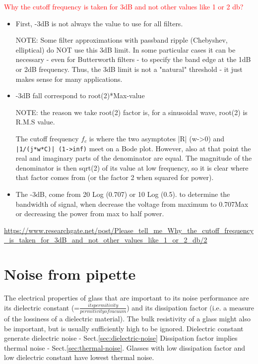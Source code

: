 \textcolor{red}{Why the cutoff frequency is taken for 3dB and not other values
like 1 or 2 db?}
\begin{itemize}
  \item First, -3dB is not always the value to use for all filters.

NOTE: Some filter approximations with passband ripple (Chebyshev, elliptical) do
NOT use this 3dB limit. In some particular cases it can be necessary - even for
Butterworth filters - to specify the band edge at the 1dB or 2dB frequency.
Thus, the 3dB limit is not a "natural" threshold - it just makes sense for many
applications.

  \item -3dB fall correspond to root(2)*Max-value

NOTE: the reason we take root(2) factor is, for a sinusoidal wave, root(2) is
R.M.S value.

The cutoff frequency $f_c$ is where the two asymptotes |R| (w->0) and
\verb!|1/(j*w*C)| (1->inf)! meet on a Bode plot.
However, also at that point the real and imaginary parts of the denominator are
equal. The magnitude of the denominator is then sqrt(2) of its value at low
frequency, so it is clear where that factor comes from (or the factor 2 when
squared for power).

  \item The -3dB, come from 20 Log (0.707) or 10 Log (0.5). to determine the
  bandwidth of signal, when decrease the voltage from maximum to 0.707Max or
  decreasing the power from max to half power.

\end{itemize}
\url{https://www.researchgate.net/post/Please_tell_me_Why_the_cutoff_frequency_is_taken_for_3dB_and_not_other_values_like_1_or_2_db/2}

\section{Noise from pipette}


The electrical properties of glass that are important to its noise performance
are its dielectric constant (=$\frac{its permitivity}{permitivity of vacuum}$)
and its dissipation factor (i.e. a measure of the lossiness of a dielectric
material). The bulk resistivity of a glass might also be important, but is
usually sufficiently high to be ignored.
Dielectric constant generate dielectric noise - Sect.\ref{sec:dielectric-noise}
Dissipation factor implies thermal noise - Sect.\ref{sec:thermal-noise}. Glasses
with low dissipation factor and low dielectric constant have lowest thermal
noise.

